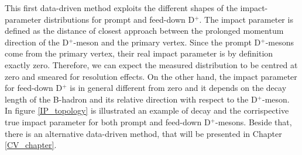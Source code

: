 \documentclass[b5paper,10pt,twoside,oldstyle,classica]{toptesi}
\begin{document}
This first data-driven method exploits the different shapes of the impact-parameter distributions for prompt and feed-down D$^+$. The impact parameter is defined as the distance of closest approach between the prolonged momentum direction of the D$^+$-meson and the primary vertex. Since the prompt D$^+$-mesons come from the primary vertex, their real impact parameter is by definition exactly zero. Therefore, we can expect the measured distribution to be centred at zero and smeared for resolution effects. On the other hand, the impact parameter for feed-down D$^+$ is in general different from zero and it depends on the decay length of the B-hadron and its relative direction with respect to the D$^+$-meson. In figure \ref{IP_topology} is illustrated an example of decay and the corrispective true impact parameter for both prompt and feed-down D$^+$-mesons. Beside that, there is an alternative data-driven method, that will be presented in Chapter \ref{CV_chapter}. 
\end{document}
